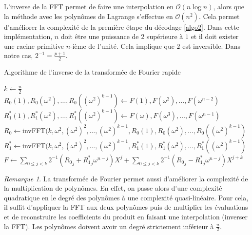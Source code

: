 \documentclass{article}
\theoremstyle{definition}
\theoremstyle{remark}
\newtheorem{remark}{Remarque}
\begin{document}
\vspace{0.5cm}

L'inverse de la FFT permet de faire une interpolation en $\mathcal{O}(n\log{}n)$, alors que la méthode avec les polynômes de Lagrange s'effectue en $\mathcal{O}(n^2)$. Cela permet d'améliorer la complexité de la première étape du décodage \ref{algo2}. Dans cette implémentation, $n$ doit être une puissance de 2 supérieure à $1$ et il doit exister une racine primitive $n$-ième de l'unité.
Cela implique que $2$ est inversible. Dans notre cas, $2^{-1} = \frac{p+1}{2}$.

\vspace{0.5cm}

\begin{algorithm}[H]
\label{algo_inv_fft}
\caption{Algorithme de l'inverse de la transformée de Fourier rapide \cite{moderncomp}}
{
} 
$k \gets \frac{n}{2}$ \\
$R_0(1), R_0(\omega^2), \dots, R_0((\omega^2)^{k-1}) \gets F(1), F(\omega^2), \dots, F(\omega^{n-2})$\\
$R_1^*(1), R_1^*(\omega^2), \dots, R_1^*((\omega^2)^{k-1}) \gets F(\omega), F(\omega^3), \dots, F(\omega^{n-1})$\\
$R_0 \gets $invFFT$(k, \omega^2, (\omega^2)^2, \dots, (\omega^2)^{k-1}, R_0(1), R_0(\omega^2), \dots, R_0((\omega^2)^{k-1})$\\
$R_1^* \gets $invFFT$(k, \omega^2, (\omega^2)^2, \dots, (\omega^2)^{k-1}, R_1^*(1), R_1^*(\omega^2), \dots, R_1^*((\omega^2)^{k-1})$\\
$F \gets \sum_{0 \le j < k} 2^{-1}({R_0}_j + {R_1^*}_j\omega^{n-j})X^j + \sum_{0 \le j < k}  2^{-1}({R_0}_j - {R_1^*}_j\omega^{n-j})X^{j+k}$\\
\end{algorithm}

\vspace{0.5cm}

\begin{remark}
    La transformée de Fourier permet aussi d'améliorer la complexité de la multiplication de polynômes. En effet, on passe alors d'une complexité quadratique en le degré des polynômes à une complexité quasi-linéaire. Pour cela, il suffit d'appliquer la FFT aux deux polynômes puis de multiplier les évaluations et de reconstruire les coefficients du produit en faisant une interpolation (inverser la FFT). Les polynômes doivent avoir un degré strictement inférieur à $\frac{n}{2}$.
\end{remark}
\end{document}
